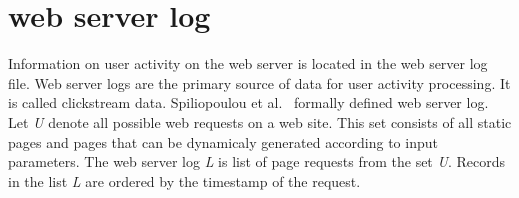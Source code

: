 \documentclass[a4paper,10pt]{article}
\begin{document}
\doublespacing

\section{web server log}
Information on user activity on the web server is located in the web server log file. Web server
logs are the primary source of data for user activity processing. It is called clickstream data.
Spiliopoulou et al.~\cite{Spiliopoulou2003} formally defined web server log. Let \textit{U} denote
all possible web requests on a web site. This set consists of all static pages and pages that can
be dynamicaly generated according to input parameters. The web server log \textit{L} is list of
page requests from the set \textit{U}. Records in the list \textit{L} are ordered by the timestamp
of the request.
\end{document}

